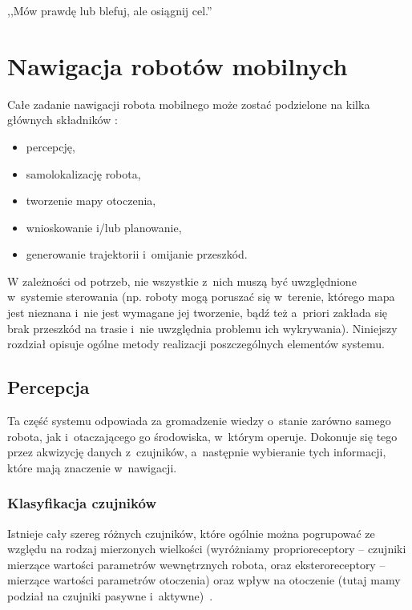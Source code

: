

\begin{savequote}[70mm]
,,Mów prawdę lub blefuj, ale osiągnij cel.''
\end{savequote}

\chapter{Nawigacja robotów mobilnych}
\label{chap:nawigacja}

Całe zadanie nawigacji robota mobilnego może zostać podzielone na kilka głównych
składników \cite[cz.~9]{szynkiewiczWR}:

\begin{itemize}
  \item percepcję,
  \item samolokalizację robota,
  \item tworzenie mapy otoczenia,
  \item wnioskowanie i/lub planowanie,
  \item generowanie trajektorii i~omijanie przeszkód.
\end{itemize}

W zależności od potrzeb, nie wszystkie z~nich muszą być uwzględnione w~systemie
sterowania (np. roboty mogą poruszać się w~terenie, którego mapa jest nieznana
i~nie jest wymagane jej tworzenie, bądź też a~priori zakłada się brak
przeszkód na trasie i~nie uwzględnia problemu ich wykrywania). Niniejszy
rozdział opisuje ogólne metody realizacji poszczególnych elementów systemu.

\section{Percepcja}

Ta część systemu odpowiada za gromadzenie wiedzy o~stanie zarówno samego robota,
jak i~otaczającego go środowiska, w~którym operuje. Dokonuje się tego przez
akwizycję danych z~czujników, a~następnie wybieranie tych informacji, które mają
znaczenie w~nawigacji.

\subsection{Klasyfikacja czujników}

Istnieje cały szereg różnych
czujników, które ogólnie można pogrupować ze względu na rodzaj mierzonych
wielkości (wyróżniamy proprioreceptory -- czujniki mierzące wartości parametrów
wewnętrznych robota, oraz eksteroreceptory -- mierzące wartości parametrów
otoczenia) oraz wpływ na otoczenie (tutaj mamy podział na czujniki pasywne
i~aktywne)~\cite{siegwart}.


